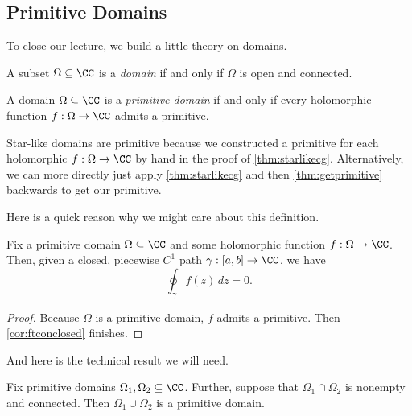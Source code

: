 \subsection{Primitive Domains}
To close our lecture, we build a little theory on domains.
\begin{definition}[Domain]
	A subset $\Omega\subseteq\CC$ is a \textit{domain} if and only if $\Omega$ is open and connected.
\end{definition}
\begin{definition}
	A domain $\Omega\subseteq\CC$ is a \textit{primitive domain} if and only if every holomorphic function $f:\Omega\to\CC$ admits a primitive.
\end{definition}
\begin{example}
	Star-like domains are primitive because we constructed a primitive for each holomorphic $f:\Omega\to\CC$ by hand in the proof of \autoref{thm:starlikecg}. Alternatively, we can more directly just apply \autoref{thm:starlikecg} and then \autoref{thm:getprimitive} backwards to get our primitive.
\end{example}
Here is a quick reason why we might care about this definition.
\begin{lemma}
	Fix a primitive domain $\Omega\subseteq\CC$ and some holomorphic function $f:\Omega\to\CC$. Then, given a closed, piecewise $C^1$ path $\gamma:[a,b]\to\CC$, we have
	\[\oint_\gamma f(z)\,dz=0.\]
\end{lemma}
\begin{proof}
	Because $\Omega$ is a primitive domain, $f$ admits a primitive. Then \autoref{cor:ftconclosed} finishes.
\end{proof}
And here is the technical result we will need.
\begin{lemma}
	Fix primitive domains $\Omega_1,\Omega_2\subseteq\CC$. Further, suppose that $\Omega_1\cap\Omega_2$ is nonempty and connected. Then $\Omega_1\cup\Omega_2$ is a primitive domain.
\end{lemma}
